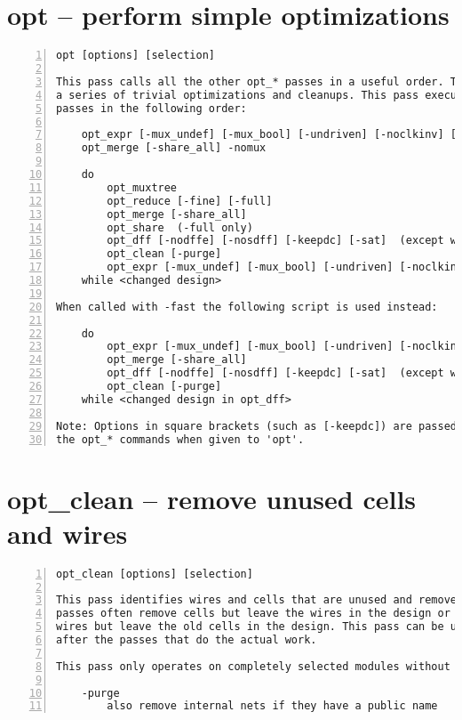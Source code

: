 \section{opt -- perform simple optimizations}
\label{cmd:opt}
\begin{lstlisting}[numbers=left,frame=single]
    opt [options] [selection]

This pass calls all the other opt_* passes in a useful order. This performs
a series of trivial optimizations and cleanups. This pass executes the other
passes in the following order:

    opt_expr [-mux_undef] [-mux_bool] [-undriven] [-noclkinv] [-fine] [-full] [-keepdc]
    opt_merge [-share_all] -nomux

    do
        opt_muxtree
        opt_reduce [-fine] [-full]
        opt_merge [-share_all]
        opt_share  (-full only)
        opt_dff [-nodffe] [-nosdff] [-keepdc] [-sat]  (except when called with -noff)
        opt_clean [-purge]
        opt_expr [-mux_undef] [-mux_bool] [-undriven] [-noclkinv] [-fine] [-full] [-keepdc]
    while <changed design>

When called with -fast the following script is used instead:

    do
        opt_expr [-mux_undef] [-mux_bool] [-undriven] [-noclkinv] [-fine] [-full] [-keepdc]
        opt_merge [-share_all]
        opt_dff [-nodffe] [-nosdff] [-keepdc] [-sat]  (except when called with -noff)
        opt_clean [-purge]
    while <changed design in opt_dff>

Note: Options in square brackets (such as [-keepdc]) are passed through to
the opt_* commands when given to 'opt'.
\end{lstlisting}

\section{opt\_clean -- remove unused cells and wires}
\label{cmd:opt_clean}
\begin{lstlisting}[numbers=left,frame=single]
    opt_clean [options] [selection]

This pass identifies wires and cells that are unused and removes them. Other
passes often remove cells but leave the wires in the design or reconnect the
wires but leave the old cells in the design. This pass can be used to clean up
after the passes that do the actual work.

This pass only operates on completely selected modules without processes.

    -purge
        also remove internal nets if they have a public name
\end{lstlisting}

